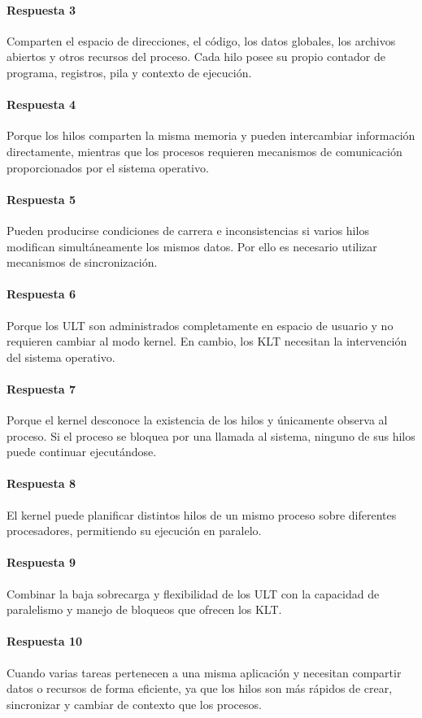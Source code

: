 \paragraph{Respuesta 3} Comparten el espacio de direcciones, el código, los datos globales, los archivos abiertos y otros recursos del proceso. Cada hilo posee su propio contador de programa, registros, pila y contexto de ejecución.

\paragraph{Respuesta 4} Porque los hilos comparten la misma memoria y pueden intercambiar información directamente, mientras que los procesos requieren mecanismos de comunicación proporcionados por el sistema operativo.

\paragraph{Respuesta 5} Pueden producirse condiciones de carrera e inconsistencias si varios hilos modifican simultáneamente los mismos datos. Por ello es necesario utilizar mecanismos de sincronización.

\paragraph{Respuesta 6} Porque los ULT son administrados completamente en espacio de usuario y no requieren cambiar al modo kernel. En cambio, los KLT necesitan la intervención del sistema operativo.

\paragraph{Respuesta 7} Porque el kernel desconoce la existencia de los hilos y únicamente observa al proceso. Si el proceso se bloquea por una llamada al sistema, ninguno de sus hilos puede continuar ejecutándose.

\paragraph{Respuesta 8} El kernel puede planificar distintos hilos de un mismo proceso sobre diferentes procesadores, permitiendo su ejecución en paralelo.

\paragraph{Respuesta 9} Combinar la baja sobrecarga y flexibilidad de los ULT con la capacidad de paralelismo y manejo de bloqueos que ofrecen los KLT.

\paragraph{Respuesta 10} Cuando varias tareas pertenecen a una misma aplicación y necesitan compartir datos o recursos de forma eficiente, ya que los hilos son más rápidos de crear, sincronizar y cambiar de contexto que los procesos.
